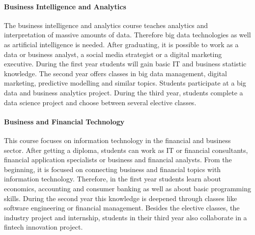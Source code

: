 \paragraph{Business Intelligence and Analytics}
The business intelligence and analytics course teaches analytics and interpretation of massive amounts of data. Therefore big data technologies as well as artificial intelligence is needed. After graduating, it is possible to work as a data or business analyst, a social media strategist or a digital marketing executive. During the first year students will gain basic IT and business statistic knowledge. The second year offers classes in big data management, digital marketing, predictive modelling and similar topics. Students participate at a big data and business analytics project.
During the third year, students complete a data science project and choose between several elective classes.

\paragraph{Business and Financial Technology}
This course focuses on information technology in the financial and business sector. After getting a diploma, students can work as IT or financial consultants, financial application specialists or business and financial analysts. From the beginning, it is focused on connecting business and financial topics with information technology. Therefore, in the first year students learn about economics, accounting and consumer banking as well as about basic programming skills. During the second year this knowledge is deepened through classes like software engineering or financial management. Besides the elective classes, the industry project and internship, students in their third year also collaborate in a fintech innovation project.

